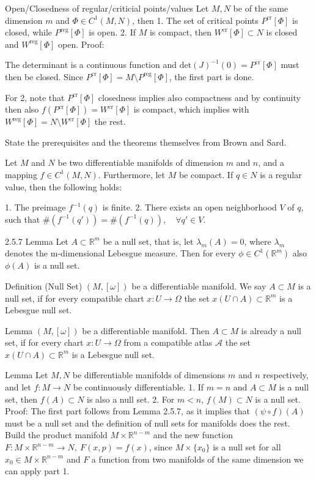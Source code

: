 Open/Closedness of regular/criticial points/values
Let \( M, N \) be of the same dimension \( m \) and \( \Phi \in C^1(M, N) \), then
1. The set of critical points \( P^{\text{cr}}[\Phi] \) is closed, while \( P^{\text{reg}}[\Phi] \) is open.
2. If \( M \) is compact, then \( W^{\text{cr}}[\Phi] \subset N \) is closed and \( W^{\text{reg}}[\Phi] \) open.
Proof:

The determinant is a continuous function and \( \text{det}(J)^{-1}(0) = P^{\text{cr}}[\Phi] \) must then be closed.
Since \( P^{\text{cr}}[\Phi] = M \setminus P^{\text{reg}}[\Phi] \), the first part is done.

For 2, note that \( P^{\text{cr}}[\Phi] \) closedness implies also compactness and by continuity then
also \( f(P^{\text{cr}}[\Phi]) = W^{\text{cr}}[\Phi] \) is compact, which implies with 
\( W^{\text{reg}}[\Phi] = N \setminus W^{\text{cr}}[\Phi] \) the rest.


State the prerequisites and the theorems themselves from Brown and Sard.

Let \(M\) and \(N\) be two differentiable manifolds of dimension \(m\) and \(n\), 
and a mapping \(f \in C^1(M, N)\). 
Furthermore, let \(M\) be compact. If \(q \in N\) is a regular value, then the following holds:

1. The preimage \(f^{-1}(q)\) is finite.
2. There exists an open neighborhood \(V\) of \(q\), such that 
\(\#(f^{-1}(q')) = \#(f^{-1}(q)), \quad \forall q' \in V.\)


2.5.7 Lemma
Let \(A \subset \mathbb{R}^m\) be a null set, that is, let \(\lambda_m(A) = 0\), where \(\lambda_m\) denotes the m-dimensional Lebesgue measure.
Then for every \(\phi \in C^1(\mathbb{R}^m)\) also \(\phi(A)\) is a null set. 

Definition (Null Set)
\((M, [\omega])\) be a differentiable manifold. We say \(A \subset M\) is a null set, if for every compatible chart \(x : U \to \Omega\) the set \(x(U \cap A) \subset \mathbb{R}^m\) is a Lebesgue null set.

Lemma
\((M, [\omega])\) be a differentiable manifold. Then \(A \subset M\) is already a null set, if for every chart \(x : U \to \Omega\) from a compatible atlas \(\mathscr{A}\) the set \(x(U \cap A) \subset \mathbb{R}^m\) is a Lebesgue null set.

Lemma
Let \(M, N\) be differentiable manifolds of dimensions \(m\) and \(n\) respectively, and let \(f: M \to N\) be continuously differentiable.
1. If \(m = n\) and \(A \subset M\) is a null set, then \(f(A) \subset N\) is also a null set.
2. For \(m < n\), \(f(M) \subset N\) is a null set.
Proof:
The first part follows from Lemma 2.5.7, as it implies that \( (\psi \circ f)(A) \) must be a null set and the definition of null sets for manifolds does the rest.
Build the product manifold \( M \times \mathbb{R}^{n - m} \) and the new function \(F: M \times \mathbb{R}^{n - m} \to N,\ F(x, p) = f(x) \),
since \(M \times \{x_0\}\) is a null set for all \( x_0 \in M \times \mathbb{R}^{n - m}\) and \( F \) a function from two manifolds of the same dimension
we can apply part 1.

